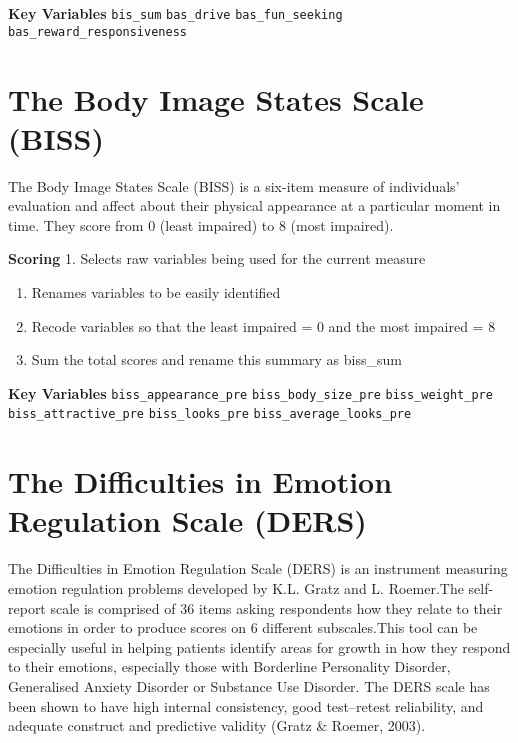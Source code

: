 \documentclass[
]{book}
\begin{document}
\textbf{Key Variables} \texttt{bis\_sum} \texttt{bas\_drive} \texttt{bas\_fun\_seeking}
\texttt{bas\_reward\_responsiveness}

\section{The Body Image States Scale (BISS)}\label{the-body-image-states-scale-biss}

The Body Image States Scale (BISS) is a six-item measure of individuals'
evaluation and affect about their physical appearance at a particular
moment in time. They score from 0 (least impaired) to 8 (most impaired).

\textbf{Scoring} 1. Selects raw variables being used for the current measure

\begin{enumerate}
\def\labelenumi{\arabic{enumi}.}
\setcounter{enumi}{1}
\item
  Renames variables to be easily identified
\item
  Recode variables so that the least impaired = 0 and the most
  impaired = 8
\item
  Sum the total scores and rename this summary as biss\_sum
\end{enumerate}

\textbf{Key Variables} \texttt{biss\_appearance\_pre} \texttt{biss\_body\_size\_pre}
\texttt{biss\_weight\_pre} \texttt{biss\_attractive\_pre} \texttt{biss\_looks\_pre}
\texttt{biss\_average\_looks\_pre}

\section{The Difficulties in Emotion Regulation Scale (DERS)}\label{the-difficulties-in-emotion-regulation-scale-ders}

The Difficulties in Emotion Regulation Scale (DERS) is an instrument
measuring emotion regulation problems developed by K.L. Gratz and L.
Roemer.The self-report scale is comprised of 36 items asking respondents
how they relate to their emotions in order to produce scores on 6
different subscales.This tool can be especially useful in helping
patients identify areas for growth in how they respond to their
emotions, especially those with Borderline Personality Disorder,
Generalised Anxiety Disorder or Substance Use Disorder. The DERS scale
has been shown to have high internal consistency, good test--retest
reliability, and adequate construct and predictive validity (Gratz \&
Roemer, 2003).
\end{document}
